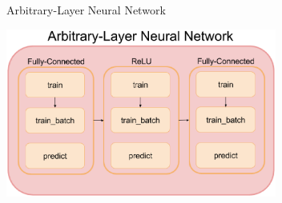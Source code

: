 \documentclass{beamer}
\begin{document}
  \begin{frame}{Arbitrary-Layer Neural Network}
    \begin{center}
      \includegraphics[width=3.5in]{../figures/arbitrary_drawing.eps}
    \end{center}
  \end{frame}

%
%
%
%
%
%  
%
\end{document}
